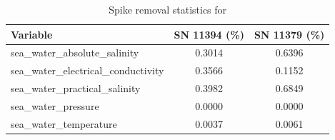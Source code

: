 \begin{table}[h]
\centering
\caption{Spike removal statistics for \projectname{} \casenumber{}}
\label{tab:spike_stats}
\begin{tabular}{|l|c|c|}
\hline
Variable & SN 11394 (\%) & SN 11379 (\%) \\
\hline
sea\_water\_absolute\_salinity & 0.3014 & 0.6396 \\
sea\_water\_electrical\_conductivity & 0.3566 & 0.1152 \\
sea\_water\_practical\_salinity & 0.3982 & 0.6849 \\
sea\_water\_pressure & 0.0000 & 0.0000 \\
sea\_water\_temperature & 0.0037 & 0.0061 \\
\hline
\end{tabular}
\end{table}
